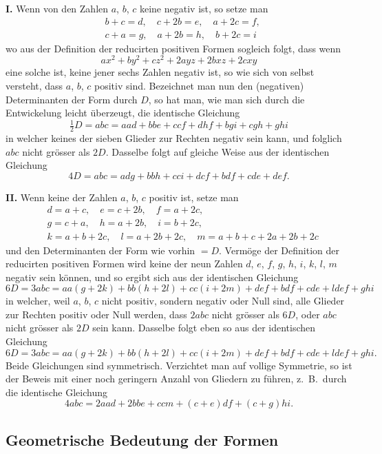 \documentclass[12pt,a4paper]{article}
\begin{document}
\textbf{I.} Wenn von den Zahlen $a$, $b$, $c$ keine negativ ist, so setze man
\[
\begin{aligned}
& b+c=d,\quad c+2b=e,\quad a+2c=f,\\
& c+a=g,\quad a+2b=h,\quad b+2c=i
\end{aligned}
\]
wo aus der Definition der reducirten positiven Formen sogleich folgt, dass wenn
\[
ax^2+by^2+cz^2+2ayz+2bxz+2cxy
\]
eine solche ist, keine jener sechs Zahlen negativ ist, so wie sich von selbst versteht, dass $a$, $b$, $c$ positiv sind. Bezeichnet man nun den (negativen) Determinanten der Form durch $D$, so hat man, wie man sich durch die Entwickelung leicht \"{u}berzeugt, die identische Gleichung
\[
\tfrac{1}{2}D = abc = aad + bbe + ccf + dhf + bgi + cgh + ghi
\]
in welcher keines der sieben Glieder zur Rechten negativ sein kann, und folglich $abc$ nicht gr\"{o}sser als $2D$. Dasselbe folgt auf gleiche Weise aus der identischen Gleichung
\[
4D = abc = adg + bbh + cci + dcf + bdf + cde + def.
\]

\textbf{II.} Wenn keine der Zahlen $a$, $b$, $c$ positiv ist, setze man
\[
\begin{aligned}
& d=a+c,\quad e=c+2b,\quad f=a+2c,\\
& g=c+a,\quad h=a+2b,\quad i=b+2c,\\
& k=a+b+2c,\quad l=a+2b+2c,\quad m=a+b+c+2a+2b+2c
\end{aligned}
\]
und den Determinanten der Form wie vorhin $=D$. Verm\"{o}ge der Definition der reducirten positiven Formen wird keine der neun Zahlen $d$, $e$, $f$, $g$, $h$, $i$, $k$, $l$, $m$ negativ sein k\"{o}nnen, und so ergibt sich aus der identischen Gleichung
\[
6D = 3abc = aa(g+2k) + bb(h+2l) + cc(i+2m) + def + bdf + cde + ldef + ghi
\]
in welcher, weil $a$, $b$, $c$ nicht positiv, sondern negativ oder Null sind, alle Glieder zur Rechten positiv oder Null werden, dass $2abc$ nicht gr\"{o}sser als $6D$, oder $abc$ nicht gr\"{o}sser als $2D$ sein kann. Dasselbe folgt eben so aus der identischen Gleichung
\[
6D = 3abc = aa(g+2k) + bb(h+2l) + cc(i+2m) + def + bdf + cde + ldef + ghi.
\]
Beide Gleichungen sind symmetrisch. Verzichtet man auf vollige Symmetrie, so ist der Beweis mit einer noch geringern Anzahl von Gliedern zu f\"{u}hren, z.~B.~durch die identische Gleichung
\[
4abc = 2aad + 2bbe + ccm + (c+e)df + (c+g)hi.\tag{25}
\]

\subsection*{Geometrische Bedeutung der Formen}
\end{document}
